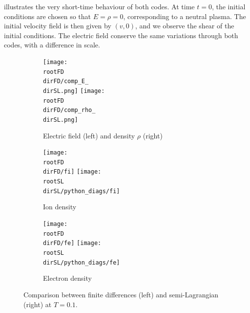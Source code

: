 \documentclass{article}
\numberwithin{equation}{section}
\newcommand{\imh}{\textwidth} %
\begin{document}
 illustrates the very short-time behaviour of both codes. At time $t=0$, the initial conditions are chosen so that $E = \rho = 0$, corresponding to a neutral plasma. The initial velocity field is then given by $(v, 0)$, and we observe the shear of the initial conditions. The electric field conserve the same variations through both codes, with a difference in scale.

\begin{figure}
	\centering
	\newcommand{\rootSL}{../code_SL/}
	\newcommand{\rootFD}{../temp_res_DF/}
	\newcommand{\dirSL}{run_comp_short_time_2sp_Nx1000_Nvi2001_Nve2001_Nt6250}
	\newcommand{\dirFD}{run_comp_short_time_2sp_Nx1000_Nv2000_Nt6250}
	
	\renewcommand{\imh}{0.33\linewidth}
	
	\begin{subfigure}{\textwidth}
		\centering
		\texttt{[image: \\rootFD\\dirFD/comp\_E\_\\dirSL.png]}
		\texttt{[image: \\rootFD\\dirFD/comp\_rho\_\\dirSL.png]}
		\caption{Electric field (left) and density $\rho$ (right)}
		\label{subfig:compT01_E_rho}
	\end{subfigure}
	
	\begin{subfigure}{\textwidth}
		\centering
		\texttt{[image: \\rootFD\\dirFD/fi]}
		\texttt{[image: \\rootSL\\dirSL/python\_diags/fi]}
		\caption{Ion density}
		\label{subfig:compT01_ion}
	\end{subfigure}
	\begin{subfigure}{\textwidth}
		\centering
		\texttt{[image: \\rootFD\\dirFD/fe]}
		\texttt{[image: \\rootSL\\dirSL/python\_diags/fe]}
		\caption{Electron density}
		\label{subfig:compT01_electron}
	\end{subfigure}
	\caption{Comparison between finite differences (left) and semi-Lagrangian (right) at $T=0.1$.}
	\label{fig:compT01}
\end{figure}  
\end{document}
